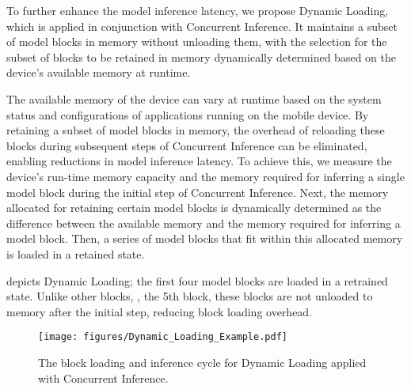 
To further enhance the model inference latency, we propose Dynamic Loading, which is applied in conjunction with Concurrent Inference. It maintains a subset of model blocks in memory without unloading them, with the selection for the subset of blocks to be retained in memory dynamically determined based on the device's available memory at runtime.

The available memory of the device can vary at runtime based on the system status and configurations of applications running on the mobile device. By retaining a subset of model blocks in memory, the overhead of reloading these blocks during subsequent steps of Concurrent Inference can be eliminated, enabling reductions in model inference latency. To achieve this, we measure the device's run-time memory capacity and the memory required for inferring a single model block during the initial step of Concurrent Inference. Next, the memory allocated for retaining certain model blocks is dynamically determined as the difference between the available memory and the memory required for inferring a model block. Then, a series of model blocks that fit within this allocated memory is loaded in a retained state.

 depicts Dynamic Loading; the first four model blocks are loaded in a retrained state. Unlike other blocks, \eg, the 5th block, these blocks are not unloaded to memory after the initial step, reducing block loading overhead. %

\begin{figure}[!ht]
    \centering
    \texttt{[image: figures/Dynamic\_Loading\_Example.pdf]}
    \caption{The block loading and inference cycle for Dynamic Loading applied with Concurrent Inference.}
    \label{fig:partitioning}
\end{figure}

